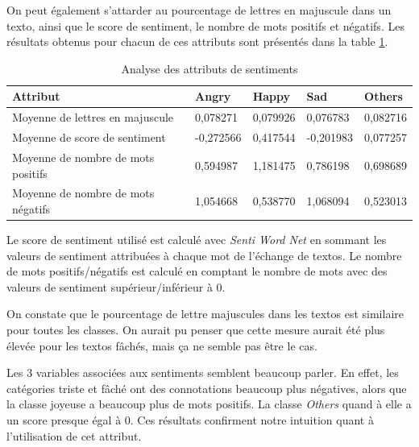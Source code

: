 On peut également s'attarder au pourcentage de lettres en majuscule dans un texto, ainsi que le score de sentiment, le nombre de mots positifs et négatifs. Les résultats obtenus pour chacun de ces attributs sont présentés dans la table \ref{table:pourcentages}.

\begin{longtable}[c]{@{}lllll@{}}
	\caption{Analyse des attributs de sentiments}
	\label{table:pourcentages}\\
	\toprule
	Attribut                           & Angry     & Happy    & Sad       & Others   \\* \midrule
	\endhead
	\bottomrule
	\endfoot
	\endlastfoot
	Moyenne de lettres en majuscule    & 0,078271  & 0,079926 & 0,076783  & 0,082716 \\
	Moyenne de score de sentiment      & -0,272566 & 0,417544 & -0,201983 & 0,077257 \\
	Moyenne de nombre de mots positifs & 0,594987  & 1,181475 & 0,786198  & 0,698689 \\
	Moyenne de nombre de mots négatifs & 1,054668  & 0,538770 & 1,068094  & 0,523013 \\* \bottomrule
\end{longtable}



Le score de sentiment utilisé est calculé avec \emph{Senti Word Net} en sommant les valeurs de sentiment attribuées à chaque mot de l'échange de textos. Le nombre de mots positifs/négatifs est calculé en comptant le nombre de mots avec des valeurs de sentiment supérieur/inférieur à 0.

On constate que le pourcentage de lettre majuscules dans les textos est similaire pour toutes les classes. On aurait pu penser que cette mesure aurait été plus élevée pour les textos fâchés, mais ça ne semble pas être le cas. 

Les 3 variables associées aux sentiments semblent beaucoup parler. En effet, les catégories triste et fâché ont des connotations beaucoup plus négatives, alors que la classe joyeuse a beaucoup plus de mots positifs. La classe \emph{Others} quand à elle a un score presque égal à 0. Ces résultats confirment notre intuition quant à l'utilisation de cet attribut.
